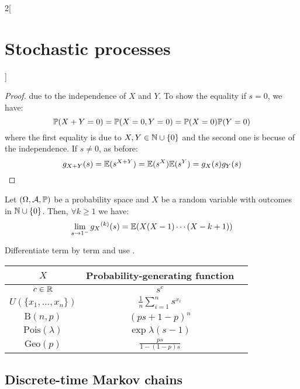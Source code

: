 \documentclass[../../../main_math.tex]{subfiles}
\begin{document}
\begin{multicols}{2}[\section{Stochastic processes}]
\begin{proof}
    due to the independence of $X$ and $Y$.
    To show the equality if $s=0$, we have:
    $$\mathbb{P}(X+Y=0)=\mathbb{P}(X=0,Y=0)=\mathbb{P}(X=0)\mathbb{P}(Y=0)$$
    where the first equality is due to $X,Y\in\mathbb{N}\cup\{0\}$ and the second one is becuse of the independence.
    If $s\ne 0$, as before: $$g_{X+Y}({s})=\mathbb{E}({s}^{X+Y})=\mathbb{E}({s}^X)\mathbb{E}({s}^Y)=g_{X}({s})g_{Y}({s})$$
  \end{proof}
  \begin{theorem}
    Let $(\Omega,\mathcal{A},\mathbb{P})$ be a probability space and $X$ be a random variable with outcomes in $\mathbb{N}\cup\{0\}$. Then, $\forall k\geq 1$ we have:
    $$\lim_{s\to 1^-}{g_X}^{(k)}(s)=\mathbb{E}(X(X-1)\cdots(X-k+1))$$
  \end{theorem}
  \begin{sproof}
    Differentiate term by term and use .
  \end{sproof}
  \begin{center}
    \def\arraystretch{1.3}
    \begin{tabular}{|c|c|c|}
      \hline
      $X$                     & Probability-generating function     \\
      \hline
      $c\in\mathbb{R}$               & $\displaystyle s^{c}$               \\
      $U(\{x_1,\ldots,x_n\})$ & $\frac{1}{n}\sum_{i=1}^n s^{x_i}$   \\
      $\text{B}(n,p)$         & $\displaystyle {(ps+1-p)}^n$        \\
      $\text{Pois}(\lambda)$  & $\displaystyle \exp{\lambda(s-1)}$  \\
      $\text{Geo}(p)$         & $\displaystyle \frac{ps}{1-(1-p)s}$ \\
      \hline
    \end{tabular}
  \end{center}
  \subsection{Discrete-time Markov chains}

\end{multicols}
\end{document}
